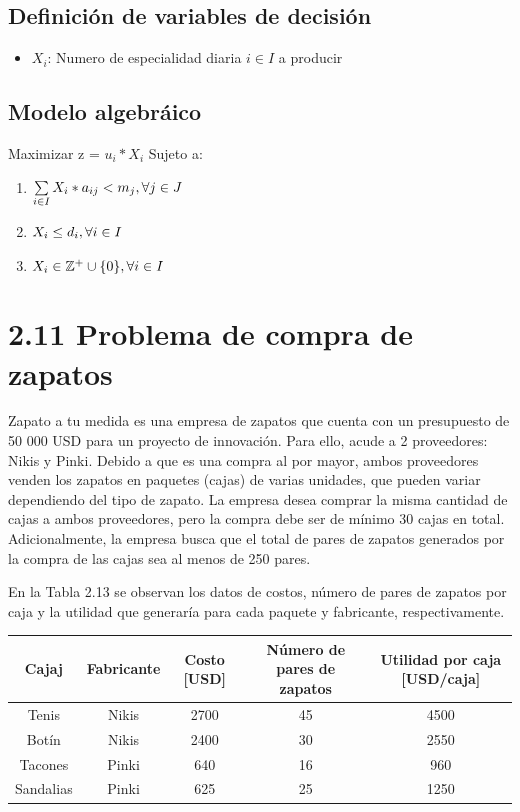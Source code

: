 \documentclass{article}
\begin{document}
\subsection*{Definición de variables de decisión}
\begin{itemize}
    \item $X_{i}$: Numero de especialidad diaria $i \in I$ a producir
\end{itemize}

\subsection*{Modelo algebráico}
Maximizar z = $u_{i} * X_{i}$ \bigskip
Sujeto a: \bigskip
\begin{enumerate}
    \item $\sum\limits_{i \in I} X_{i} * a_{ij} < m_{j}, \hfill \forall j \in J$
    \item $X_{i} \leq d_{i}, \hfill \forall i \in I$
    \item $X_{i} \in \mathbb{Z^+} \cup \{0\}, \hfill \forall i \in I$
\end{enumerate}

\section*{2.11 Problema de compra de zapatos}
Zapato a tu medida es una empresa de zapatos que cuenta con un
presupuesto de 50 000 USD para un proyecto de innovación. Para ello,
acude a 2 proveedores: Nikis y Pinki. Debido a que es una compra al por
mayor, ambos proveedores venden los zapatos en paquetes (cajas) de varias
unidades, que pueden variar dependiendo del tipo de zapato. La empresa
desea comprar la misma cantidad de cajas a ambos proveedores, pero la
compra debe ser de mínimo 30 cajas en total. Adicionalmente, la empresa
busca que el total de pares de zapatos generados por la compra de las cajas
sea al menos de 250 pares. \bigskip

En la Tabla 2.13 se observan los datos de costos, número de pares
de zapatos por caja y la utilidad que generaría para cada paquete y
fabricante, respectivamente. \bigskip

\begin{tabular}{|c|cccc|}
\hline
Cajaj & Fabricante & Costo [USD] & Número de pares de zapatos & Utilidad por caja [USD/caja] \\
\hline
Tenis & Nikis & 2700 & 45 & 4500 \\
Botín & Nikis & 2400 & 30 & 2550 \\
Tacones & Pinki & 640 & 16 & 960 \\
Sandalias & Pinki & 625 & 25 & 1250 \\
\hline
\end{tabular}
\end{document}
